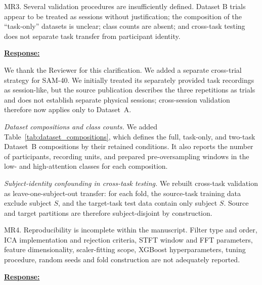 \documentclass{article}
\begin{document}
\vspace{0.3cm}


\begin{cmt}{}{}

MR3. Several validation procedures are insufficiently defined. Dataset B
trials appear to be treated as sessions without justification; the
composition of the ``task-only'' datasets is unclear; class counts are
absent; and cross-task testing does not separate task transfer from
participant identity.

\end{cmt}
\vspace{0.1cm}
\noindent
\underline{\textbf{Response:}}
\vspace{0.2cm}

We thank the Reviewer for this clarification. We added a separate cross-trial
strategy for SAM-40. We initially treated its
separately provided task recordings as session-like, but the source publication
describes the three repetitions as trials and does not establish separate
physical sessions; cross-session validation therefore now applies only to
Dataset~A.

\emph{Dataset compositions and class counts.} We added
Table~\ref{tab:dataset_compositions}, which defines the full, task-only, and
two-task Dataset~B compositions by their retained conditions. It also reports
the number of participants, recording units, and prepared pre-oversampling
windows in the low- and high-attention classes for each composition.

\emph{Subject-identity confounding in cross-task testing.} We rebuilt
cross-task validation as leave-one-subject-out transfer: for each fold, the
source-task training data exclude subject $S$, and the target-task test data
contain only subject $S$. Source and target partitions are therefore
subject-disjoint by construction.

\vspace{0.3cm}


\begin{cmt}{}{}

MR4. Reproducibility is incomplete within the manuscript. Filter type and order,
ICA implementation and rejection criteria, STFT window and FFT parameters,
feature dimensionality, scaler-fitting scope, XGBoost hyperparameters, tuning
procedure, random seeds and fold construction are not adequately reported.

\end{cmt}
\vspace{0.1cm}
\noindent
\underline{\textbf{Response:}}
\vspace{0.2cm}
\end{document}
